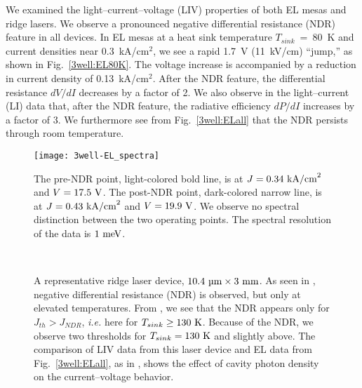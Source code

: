 We examined the light--current--voltage (LIV) properties of both EL mesas and ridge lasers.  We observe a pronounced negative differential resistance (NDR) feature in all devices.  In EL mesas at a heat sink temperature $T_{sink}$~=~80~K and current densities near 0.3~kA/cm$^2$, we see a rapid 1.7~V (11~kV/cm) ``jump,'' as shown in Fig.~\ref{3well:EL80K}.  The voltage increase is accompanied by a reduction in current density of 0.13~kA/cm$^2$.  After the NDR feature, the differential resistance $dV/dI$ decreases by a factor of 2.  We also observe in the light--current (LI) data that, after the NDR feature, the radiative efficiency $dP/dI$ increases by a factor of 3.  We furthermore see from Fig.~\ref{3well:ELall} that the NDR persists through room temperature.

\begin{figure}[tp]
\centering
\texttt{[image: 3well-EL\_spectra]}
\caption[Comparison of EL spectra at pre- and post-NDR operating points]{  The pre-NDR point, light-colored bold line, is at $J=0.34~\textnormal{kA/cm}^2$ and $V=17.5~\textnormal{V}$.  The post-NDR point, dark-colored narrow line, is at $J=0.43~\textnormal{kA/cm}^2$ and $V=19.9~\textnormal{V}$.  We observe no spectral distinction between the two operating points.  The spectral resolution of the data is $1~\textnormal{meV}$.}
\label{3well:EL_spectra}
\end{figure}


\begin{figure}[tp]
\centering
{}%
\\
%
\hfil
{}%
\caption[Three injector well LIV]{ A representative ridge laser device, $10.4~\tn{\um}\times3~\tn{mm}$.  As seen in , negative differential resistance (NDR) is observed, but only at elevated temperatures.  From , we see that the NDR appears only for $J_{th}>J_{NDR}$, \emph{i.e.} here for $T_{sink}\geq130~\textnormal{K}$.  Because of the NDR, we observe two thresholds for $T_{sink}=130~\textnormal{K}$ and slightly above.  The comparison of LIV data from this laser device and EL data from Fig.~\ref{3well:ELall}, as in , shows the effect of cavity photon density on the current--voltage behavior.}
\label{3well:lasing_LIV}
\end{figure}

